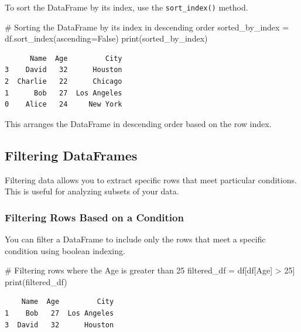 \documentclass[
  letterpaper,
  DIV=11,
  numbers=noendperiod]{scrreprt}
\newenvironment{Shaded}{\begin{snugshade}}{\end{snugshade}}
\newcommand{\BuiltInTok}[1]{\textcolor[rgb]{0.00,0.23,0.31}{#1}}
\newcommand{\CommentTok}[1]{\textcolor[rgb]{0.37,0.37,0.37}{#1}}
\newcommand{\DecValTok}[1]{\textcolor[rgb]{0.68,0.00,0.00}{#1}}
\newcommand{\NormalTok}[1]{\textcolor[rgb]{0.00,0.23,0.31}{#1}}
\newcommand{\OperatorTok}[1]{\textcolor[rgb]{0.37,0.37,0.37}{#1}}
\newcommand{\StringTok}[1]{\textcolor[rgb]{0.13,0.47,0.30}{#1}}
\newcommand{\VariableTok}[1]{\textcolor[rgb]{0.07,0.07,0.07}{#1}}
\begin{document}
To sort the DataFrame by its index, use the \texttt{sort\_index()}
method.

\begin{Shaded}
\begin{Highlighting}[]
\CommentTok{\# Sorting the DataFrame by its index in descending order}
\NormalTok{sorted\_by\_index }\OperatorTok{=}\NormalTok{ df.sort\_index(ascending}\OperatorTok{=}\VariableTok{False}\NormalTok{)}
\BuiltInTok{print}\NormalTok{(sorted\_by\_index)}
\end{Highlighting}
\end{Shaded}

\begin{verbatim}
      Name  Age         City
3    David   32      Houston
2  Charlie   22      Chicago
1      Bob   27  Los Angeles
0    Alice   24     New York
\end{verbatim}

This arranges the DataFrame in descending order based on the row index.

\hypertarget{filtering-dataframes}{%
\subsection{Filtering DataFrames}\label{filtering-dataframes}}

Filtering data allows you to extract specific rows that meet particular
conditions. This is useful for analyzing subsets of your data.

\hypertarget{filtering-rows-based-on-a-condition}{%
\subsubsection{Filtering Rows Based on a
Condition}\label{filtering-rows-based-on-a-condition}}

You can filter a DataFrame to include only the rows that meet a specific
condition using boolean indexing.

\begin{Shaded}
\begin{Highlighting}[]
\CommentTok{\# Filtering rows where the Age is greater than 25}
\NormalTok{filtered\_df }\OperatorTok{=}\NormalTok{ df[df[}\StringTok{\textquotesingle{}Age\textquotesingle{}}\NormalTok{] }\OperatorTok{\textgreater{}} \DecValTok{25}\NormalTok{]}
\BuiltInTok{print}\NormalTok{(filtered\_df)}
\end{Highlighting}
\end{Shaded}

\begin{verbatim}
    Name  Age         City
1    Bob   27  Los Angeles
3  David   32      Houston
\end{verbatim}
\end{document}
